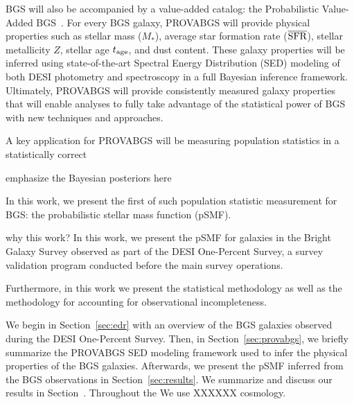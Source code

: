BGS will also be accompanied by a value-added catalog: the Probabilistic
Value-Added BGS~\citep[PROVABGS;][]{hahn2022, kwon2022}.  
For every BGS galaxy, PROVABGS will provide physical properties such as stellar
mass ($M_*$), average star formation rate ($\overline{\rm SFR}$), stellar
metallicity $Z$, stellar age $t_{\rm age}$, and dust content. 
These galaxy properties will be inferred using state-of-the-art Spectral Energy
Distribution (SED) modeling of both DESI photometry and spectroscopy in a full
Bayesian inference framework. 
Ultimately, PROVABGS will provide consistently measured galaxy properties that
will enable analyses to fully take advantage of the statistical power of BGS
with new techniques and approaches. 

A key application for PROVABGS will be measuring population statistics in a 
statistically correct  

emphasize the Bayesian posteriors here 

In this work, we present the first of such population statistic measurement for
BGS: the probabilistic stellar mass function (pSMF). 

{\color{red} why this work?} 
In this work, we present the pSMF for galaxies in the Bright Galaxy Survey
observed as part of the DESI One-Percent Survey, a survey validation program
conducted before the main survey operations. 

Furthermore, in this work we present the statistical methodology as well as the
methodology for accounting for observational incompleteness. 

We begin in Section~\ref{sec:edr} with an overview of the BGS galaxies observed
during the DESI One-Percent Survey. 
Then, in Section~\ref{sec:provabgs}, we briefly summarize the PROVABGS SED
modeling framework used to infer the physical properties of the BGS galaxies.
Afterwards, we present the pSMF inferred from the BGS observations in
Section~\ref{sec:results}. 
We summarize and discuss our results in Section~\cite{sec:summary}.
Throughout the 
We use XXXXXX cosmology.
